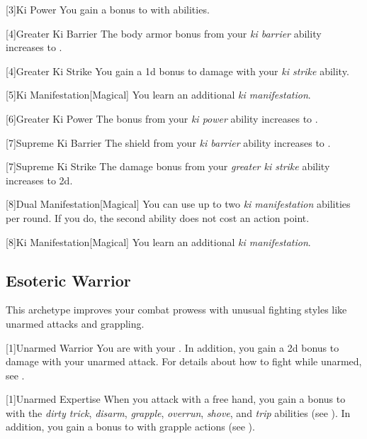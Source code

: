         [3]{Ki Power} You gain a  bonus to  with  abilities.

        [4]{Greater Ki Barrier} The body armor bonus from your \textit{ki barrier} ability increases to .

        [4]{Greater Ki Strike} You gain a \plus1d bonus to damage with your \textit{ki strike} ability.

        [5]{Ki Manifestation}[Magical]
        You learn an additional \textit{ki manifestation}.

        [6]{Greater Ki Power} The bonus from your \textit{ki power} ability increases to .

        [7]{Supreme Ki Barrier} The shield from your \textit{ki barrier} ability increases to .

        [7]{Supreme Ki Strike} The damage bonus from your \textit{greater ki strike} ability increases to \plus2d.

        [8]{Dual Manifestation}[Magical] You can use up to two \textit{ki manifestation} abilities per round.
        If you do, the second ability does not cost an action point.

        [8]{Ki Manifestation}[Magical]
        You learn an additional \textit{ki manifestation}.

    \subsection{Esoteric Warrior}\label{Esoteric Warrior}
        This archetype improves your combat prowess with unusual fighting styles like unarmed attacks and grappling.

        [1]{Unarmed Warrior}
        You are  with your .
        In addition, you gain a \plus2d bonus to damage with your unarmed attack.
        For details about how to fight while unarmed, see .

        [1]{Unarmed Expertise}
        When you attack with a free hand, you gain a  bonus to  with the \textit{dirty trick}, \textit{disarm}, \textit{grapple}, \textit{overrun}, \textit{shove}, and \textit{trip} abilities (see ).
        In addition, you gain a  bonus to  with grapple actions (see ).

